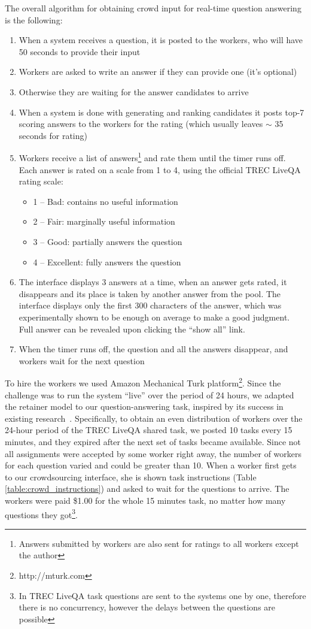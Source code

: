 The overall algorithm for obtaining crowd input for real-time question answering is the following:
\begin{enumerate}
\item When a system receives a question, it is posted to the workers, who will have 50 seconds to provide their input
\item Workers are asked to write an answer if they can provide one (it's optional)
\item Otherwise they are waiting for the answer candidates to arrive
\item When a system is done with generating and ranking candidates it posts top-7 scoring answers to the workers for the rating (which usually leaves $\sim$ 35 seconds for rating)
\item Workers receive a list of answers\footnote{Answers submitted by workers are also sent for ratings to all workers except the author} and rate them until the timer runs off. Each answer is rated on a scale from 1 to 4, using the official TREC LiveQA rating scale:
	\begin{itemize}[noitemsep,topsep=0pt]
    \item 1 -- Bad: contains no useful information
    \item 2 -- Fair: marginally useful information
    \item 3 -- Good: partially answers the question
    \item 4 -- Excellent: fully answers the question
    \end{itemize}
\item The interface displays 3 answers at a time, when an answer gets rated, it disappears and its place is taken by another answer from the pool. The interface displays only the first 300 characters of the answer, which was experimentally shown to be enough on average to make a good judgment.
Full answer can be revealed upon clicking the ``show all'' link.
\item When the timer runs off, the question and all the answers disappear, and workers wait for the next question
\end{enumerate}

To hire the workers we used Amazon Mechanical Turk platform\footnote{http://mturk.com}.
Since the challenge was to run the system ``live'' over the period of 24 hours, we adapted the retainer model to our question-answering task, inspired by its success in existing research~\cite{bernstein2011crowds,bigham2010vizwiz}.
Specifically, to obtain an even distribution of workers over the 24-hour period of the TREC LiveQA shared task, we posted 10 tasks every 15 minutes, and they expired after the next set of tasks became available.
Since not all assignments were accepted by some worker right away, the number of workers for each question varied and could be greater than 10.
When a worker first gets to our crowdsourcing interface, she is shown task instructions (Table \ref{table:crowd_instructions}) and asked to wait for the questions to arrive.
The workers were paid \$1.00 for the whole 15 minutes task, no matter how many questions they got\footnote{In TREC LiveQA task questions are sent to the systems one by one, therefore there is no concurrency, however the delays between the questions are possible}.

